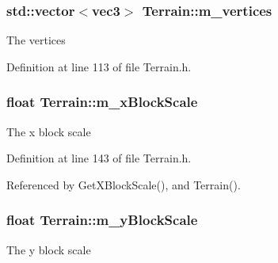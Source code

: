 \subsubsection[{\texorpdfstring{m\+\_\+vertices}{m_vertices}}]{\setlength{\rightskip}{0pt plus 5cm}std\+::vector$<${\bf vec3}$>$ Terrain\+::m\+\_\+vertices\hspace{0.3cm}{\ttfamily [private]}}\hypertarget{class_terrain_aae8e29e9fa34cddbac685e2ab286cf90}{}\label{class_terrain_aae8e29e9fa34cddbac685e2ab286cf90}


The vertices 



Definition at line 113 of file Terrain.\+h.

\subsubsection[{\texorpdfstring{m\+\_\+x\+Block\+Scale}{m_xBlockScale}}]{\setlength{\rightskip}{0pt plus 5cm}float Terrain\+::m\+\_\+x\+Block\+Scale\hspace{0.3cm}{\ttfamily [private]}}\hypertarget{class_terrain_aa0d137e5e0e7aaa3b348be32d4dc03ad}{}\label{class_terrain_aa0d137e5e0e7aaa3b348be32d4dc03ad}


The x block scale 



Definition at line 143 of file Terrain.\+h.



Referenced by Get\+X\+Block\+Scale(), and Terrain().

\subsubsection[{\texorpdfstring{m\+\_\+y\+Block\+Scale}{m_yBlockScale}}]{\setlength{\rightskip}{0pt plus 5cm}float Terrain\+::m\+\_\+y\+Block\+Scale\hspace{0.3cm}{\ttfamily [private]}}\hypertarget{class_terrain_a265cfbe55c45e80dade2f9dfe77d5055}{}\label{class_terrain_a265cfbe55c45e80dade2f9dfe77d5055}


The y block scale 



